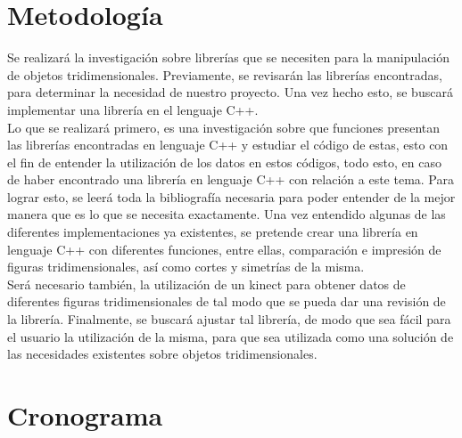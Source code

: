 \documentclass[letterpaper]{article}
\begin{document}
\section{Metodología}


Se realizará la investigación sobre librerías que se necesiten para la manipulación de objetos tridimensionales. Previamente, se revisarán las 
librerías encontradas, para determinar la necesidad de nuestro proyecto. 
Una vez hecho esto, se buscará implementar una librería en el lenguaje C++.\\

Lo que se realizará primero, es una investigación sobre que funciones presentan las librerías encontradas en lenguaje C++ y estudiar el código de estas,
esto con el fin de entender la utilización de los datos en estos códigos, todo esto, en caso de haber encontrado una librería en lenguaje C++ con relación a este tema.
Para lograr esto, se leerá toda la bibliografía necesaria para poder entender de la mejor manera que es lo que se necesita exactamente. Una vez
entendido algunas de las diferentes implementaciones ya existentes, se pretende crear una librería en lenguaje C++ con diferentes funciones, entre ellas,
comparación e impresión de figuras tridimensionales, así como cortes y simetrías de la misma. \\

Será necesario también, la utilización de un
kinect para obtener datos de diferentes figuras tridimensionales de tal modo que se pueda dar una revisión de la librería. Finalmente, se buscará ajustar tal librería,
de modo que sea fácil para el usuario la utilización de la misma, para que sea utilizada como una solución de las necesidades
existentes sobre objetos tridimensionales.\\


\section{Cronograma}
\end{document}
